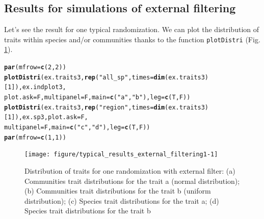 \documentclass[12pt]{article}\usepackage[]{graphicx}\usepackage[]{color}
\makeatletter
\newcommand{\hlnum}[1]{\textcolor[rgb]{0.686,0.059,0.569}{#1}}%
\newcommand{\hlstr}[1]{\textcolor[rgb]{0.192,0.494,0.8}{#1}}%
\newcommand{\hlstd}[1]{\textcolor[rgb]{0.345,0.345,0.345}{#1}}%
\newcommand{\hlkwc}[1]{\textcolor[rgb]{0.333,0.667,0.333}{#1}}%
\newcommand{\hlkwd}[1]{\textcolor[rgb]{0.737,0.353,0.396}{\textbf{#1}}}%
\newenvironment{kframe}{%
 \def\at@end@of@kframe{}%
 \ifinner\ifhmode%
  \def\at@end@of@kframe{\end{minipage}}%
  \begin{minipage}{\columnwidth}%
 \fi\fi%
 \def\FrameCommand##1{\hskip\@totalleftmargin \hskip-\fboxsep
 \colorbox{shadecolor}{##1}\hskip-\fboxsep
     \hskip-\linewidth \hskip-\@totalleftmargin \hskip\columnwidth}%
 \MakeFramed {\advance\hsize-\width
   \@totalleftmargin\z@ \linewidth\hsize
   \@setminipage}}%
 {\par\unskip\endMakeFramed%
 \at@end@of@kframe}
\newenvironment{knitrout}{}{} %
\makeatother
\begin{document}
 \subsection {Results for simulations of external filtering}

Let's see the result for one typical randomization. We can plot the distribution of traits within species and/or communities thanks to the function \texttt{plotDistri} (Fig. \ref{fig:typical_results_external_filtering1}). 

\begin{knitrout}\small
{}\color{fgcolor}\begin{kframe}
\begin{alltt}
\hlkwd{par}\hlstd{(}\hlkwc{mfrow}\hlstd{=}\hlkwd{c}\hlstd{(}\hlnum{2}\hlstd{,} \hlnum{2}\hlstd{))}
\hlkwd{plotDistri}\hlstd{(ex.traits3,} \hlkwd{rep}\hlstd{(}\hlstr{"all_sp"}\hlstd{,} \hlkwc{times} \hlstd{=} \hlkwd{dim}\hlstd{(ex.traits3)[}\hlnum{1}\hlstd{]), ex.indplot3,}
           \hlkwc{plot.ask} \hlstd{= F,} \hlkwc{multipanel} \hlstd{= F,} \hlkwc{main} \hlstd{=} \hlkwd{c}\hlstd{(}\hlstr{"a"}\hlstd{,} \hlstr{"b"}\hlstd{),} \hlkwc{leg} \hlstd{=} \hlkwd{c}\hlstd{(T, F))}
\hlkwd{plotDistri}\hlstd{(ex.traits3,} \hlkwd{rep}\hlstd{(}\hlstr{"region"}\hlstd{,} \hlkwc{times} \hlstd{=} \hlkwd{dim}\hlstd{(ex.traits3)[}\hlnum{1}\hlstd{]), ex.sp3,} \hlkwc{plot.ask} \hlstd{= F,}
           \hlkwc{multipanel} \hlstd{= F,} \hlkwc{main} \hlstd{=} \hlkwd{c}\hlstd{(}\hlstr{"c"}\hlstd{,} \hlstr{"d"}\hlstd{),} \hlkwc{leg} \hlstd{=} \hlkwd{c}\hlstd{(T, F))}
\hlkwd{par}\hlstd{(}\hlkwc{mfrow}\hlstd{=}\hlkwd{c}\hlstd{(}\hlnum{1}\hlstd{,} \hlnum{1}\hlstd{))}
\end{alltt}
\end{kframe}\begin{figure}

{\centering \texttt{[image: figure/typical\_results\_external\_filtering1-1]} 

}

\caption[Distribution of traits for one randomization with external filter]{Distribution of traits for one randomization with external filter: (a) Communities trait distributions for the trait a (normal distribution); (b) Communities trait distributions for the trait b (uniform distribution); (c) Species trait distributions for the trait a; (d) Species trait distributions for the trait b\label{fig:typical_results_external_filtering1}}
\end{figure}


\end{knitrout}
\end{document}
